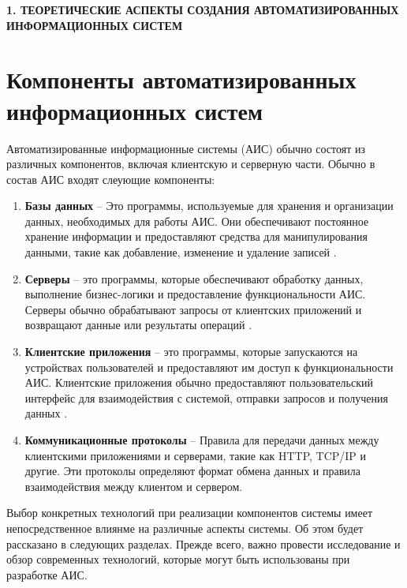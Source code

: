 \newpage
\begin{center}
    \textbf{\large 1. ТЕОРЕТИЧЕСКИЕ АСПЕКТЫ СОЗДАНИЯ АВТОМАТИЗИРОВАННЫХ ИНФОРМАЦИОННЫХ СИСТЕМ}
\end{center}



\section{Компоненты автоматизированных информационных систем}
Автоматизированные информационные системы (АИС) обычно состоят из различных компонентов, 
включая клиентскую и серверную части.
Обычно в состав АИС входят слеующие компоненты:

\begin{enumerate}
    \item \textbf{Базы данных} -- Это программы, используемые для 
    хранения и организации данных, необходимых для работы АИС. 
    Они обеспечивают постоянное хранение информации и предоставляют средства для манипулирования данными, 
    такие как добавление, изменение и удаление записей \cite[17]{DatabaseIP}. 
    
    \item \textbf{Серверы} -- это программы, которые обеспечивают обработку данных, 
    выполнение бизнес-логики и предоставление функциональности АИС. 
    Серверы обычно обрабатывают запросы от клиентских приложений и возвращают данные или
    результаты операций \cite{MicroservicesMax}.
    
    \item \textbf{Клиентские приложения} -- это программы, которые запускаются 
    на устройствах пользователей и предоставляют им доступ к функциональности АИС. 
    Клиентские приложения обычно предоставляют пользовательский интерфейс для взаимодействия с системой, 
    отправки запросов и получения данных \cite{ClientServer}.
    
    \item \textbf{Коммуникационные протоколы} -- Правила для передачи данных между 
    клиентскими приложениями и серверами, такие как HTTP, TCP/IP и другие. 
    Эти протоколы определяют формат обмена данных и правила взаимодействия между клиентом и сервером.
\end{enumerate}

Выбор конкретных технологий при реализации компонентов системы имеет 
непосредственное влиянме на различные аспекты системы. 
Об этом будет рассказано в следующих разделах.
Прежде всего, важно провести исследование и обзор 
современных технологий, которые могут быть использованы при разработке АИС.


